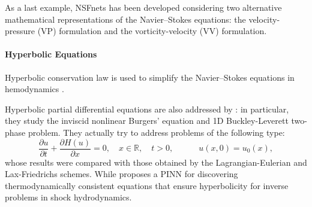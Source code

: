 \documentclass[pdflatex,sn-basic]{sn-jnl}%
\theoremstyle{thmstyleone}%
\theoremstyle{thmstyletwo}%
\theoremstyle{thmstylethree}%
\begin{document}
As a last example, NSFnets \citep{Jin2021_NsfnetsNavierStokes_CaiJCLK} has been developed considering two alternative mathematical representations of the Navier--Stokes equations: the velocity-pressure (VP) formulation and the vorticity-velocity (VV) formulation.

\paragraph{Hyperbolic Equations}
Hyperbolic conservation law is used to simplify the  Navier–Stokes equations in hemodynamics \citep{Kis2020_MachineLearningCardiovascular_YanKYH}. 

Hyperbolic partial differential equations are also addressed by \cite{Abr2021_StudyFeedforwardNeural_FloAF}: in particular, they study the inviscid nonlinear Burgers' equation and 1D Buckley-Leverett two-phase problem. They actually try to address problems of the following type:
\begin{equation*}
\frac{\partial u}{\partial t}+
\frac{\partial H(u)}{\partial x} = 0, 
\quad x \in \mathbb{R}, \quad t > 0, \quad \quad \quad u(x,0) = u_0(x),
\label{ivp2b}
\end{equation*}
whose results were compared with those obtained by the Lagrangian-Eulerian and Lax-Friedrichs schemes.
While \cite{Pat2022_ThermodynamicallyConsistentPhysics_ManPMT} proposes a PINN for discovering thermodynamically consistent equations that ensure hyperbolicity for inverse problems in shock hydrodynamics.
\\
\end{document}
